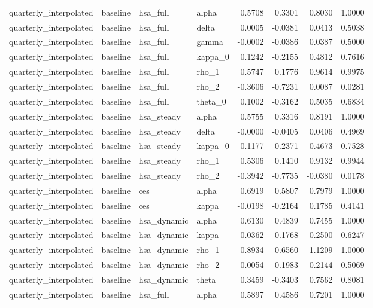 \begin{tabular}{llllrrrr}
quarterly\_interpolated & baseline & hsa\_full & alpha & 0.5708 & 0.3301 & 0.8030 & 1.0000 \\
quarterly\_interpolated & baseline & hsa\_full & delta & 0.0005 & -0.0381 & 0.0413 & 0.5038 \\
quarterly\_interpolated & baseline & hsa\_full & gamma & -0.0002 & -0.0386 & 0.0387 & 0.5000 \\
quarterly\_interpolated & baseline & hsa\_full & kappa\_0 & 0.1242 & -0.2155 & 0.4812 & 0.7616 \\
quarterly\_interpolated & baseline & hsa\_full & rho\_1 & 0.5747 & 0.1776 & 0.9614 & 0.9975 \\
quarterly\_interpolated & baseline & hsa\_full & rho\_2 & -0.3606 & -0.7231 & 0.0087 & 0.0281 \\
quarterly\_interpolated & baseline & hsa\_full & theta\_0 & 0.1002 & -0.3162 & 0.5035 & 0.6834 \\
quarterly\_interpolated & baseline & hsa\_steady & alpha & 0.5755 & 0.3316 & 0.8191 & 1.0000 \\
quarterly\_interpolated & baseline & hsa\_steady & delta & -0.0000 & -0.0405 & 0.0406 & 0.4969 \\
quarterly\_interpolated & baseline & hsa\_steady & kappa\_0 & 0.1177 & -0.2371 & 0.4673 & 0.7528 \\
quarterly\_interpolated & baseline & hsa\_steady & rho\_1 & 0.5306 & 0.1410 & 0.9132 & 0.9944 \\
quarterly\_interpolated & baseline & hsa\_steady & rho\_2 & -0.3942 & -0.7735 & -0.0380 & 0.0178 \\
quarterly\_interpolated & baseline & ces & alpha & 0.6919 & 0.5807 & 0.7979 & 1.0000 \\
quarterly\_interpolated & baseline & ces & kappa & -0.0198 & -0.2164 & 0.1785 & 0.4141 \\
quarterly\_interpolated & baseline & hsa\_dynamic & alpha & 0.6130 & 0.4839 & 0.7455 & 1.0000 \\
quarterly\_interpolated & baseline & hsa\_dynamic & kappa & 0.0362 & -0.1768 & 0.2500 & 0.6247 \\
quarterly\_interpolated & baseline & hsa\_dynamic & rho\_1 & 0.8934 & 0.6560 & 1.1209 & 1.0000 \\
quarterly\_interpolated & baseline & hsa\_dynamic & rho\_2 & 0.0054 & -0.1983 & 0.2144 & 0.5069 \\
quarterly\_interpolated & baseline & hsa\_dynamic & theta & 0.3459 & -0.3403 & 0.7562 & 0.8081 \\
quarterly\_interpolated & baseline & hsa\_full & alpha & 0.5897 & 0.4586 & 0.7201 & 1.0000 \\

\end{tabular}
